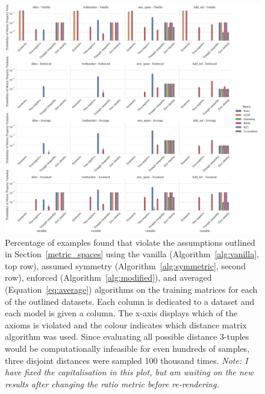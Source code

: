 \documentclass[preprint,12pt]{elsarticle}
\newcommand{\cm}[1]{\textit{{\color{blue}#1}}}
\begin{document}
\begin{figure}
    \includegraphics[width=\textwidth]{images/read_world_check.pdf}
    \caption{Percentage of examples found that violate the assumptions outlined in Section~\ref{metric_spaces} using the vanilla (Algorithm~\ref{alg:vanilla}, top row), assumed symmetry (Algorithm~\ref{alg:symmetric}, second row), enforced (Algorithm~\ref{alg:modified}), and averaged (Equation~\ref{eq:average}) algorithms on the training matrices for each of the outlined datasets. Each column is dedicated to a dataset and each model is given a column. The x-axis displays which of the axioms is violated and the colour indicates which distance matrix algorithm was used. Since evaluating all possible distance 3-tuples would be computationally infeasible for even hundreds of samples, three disjoint distances were sampled  100 thousand times. \cm{Note: I have fixed the capitalisation in this plot, but am waiting on the new results after changing the ratio metric before re-rendering.}}
    \label{fig:real_world_check}
\end{figure}
\end{document}
